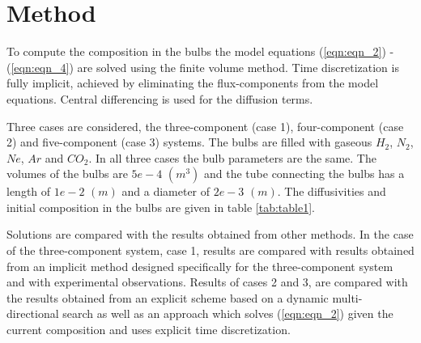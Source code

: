 \documentclass[11]{Report}
\begin{document}
\section*{Method}
To compute the composition in the bulbs the model equations (\ref{eqn:eqn_2}) - (\ref{eqn:eqn_4}) are solved using the finite volume method. Time discretization is fully implicit, achieved by eliminating the flux-components from the model equations. Central differencing is used for the diffusion terms.

Three cases are considered, the three-component (case 1), four-component (case 2) and five-component (case 3) systems. The bulbs are filled with gaseous $H_2$, $N_2$, $Ne$, $Ar$ and $CO_2$. In all three cases the bulb parameters are the same. The volumes of the bulbs are $5e-4$ $(m^3)$ and the tube connecting the bulbs has a length of $1e-2$ $(m)$ and a diameter of $2e-3$ $(m)$. The diffusivities and initial composition in the bulbs are given in table \ref{tab:table1}.

Solutions are compared with the results obtained from other methods. In the case of the three-component system, case 1, results are compared with results obtained from an implicit method designed specifically for the three-component system and with experimental observations. Results of cases 2 and 3, are compared with the results obtained from an explicit scheme based on a dynamic multi-directional search as well as an approach which solves (\ref{eqn:eqn_2}) given the current composition and uses explicit time discretization. 
\end{document}
